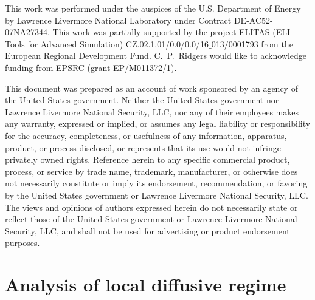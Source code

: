 \documentclass[
 aps,
 jmp,
 amsmath,amssymb,
 twocolumn,
]{revtex4-1}
\begin{document}
\begin{acknowledgments}
This work was performed under the auspices of the U.S. Department of Energy by Lawrence Livermore National Laboratory under Contract DE-AC52-07NA27344.
This work was partially supported by the project ELITAS (ELI Tools for Advanced Simulation) CZ.02.1.01/0.0/0.0/16$\_$013/0001793 from the European Regional Development Fund.
C.~P.~Ridgers would like to acknowledge funding from EPSRC (grant EP/M011372/1). 

This document was prepared as an account of work sponsored by an agency of the United States government. Neither the United States government nor Lawrence Livermore National Security, LLC, nor any of their employees makes any warranty, expressed or implied, or assumes any legal liability or responsibility for the accuracy, completeness, or usefulness of any information, apparatus, product, or process disclosed, or represents that its use would not infringe privately owned rights. Reference herein to any specific commercial product, process, or service by trade name, trademark, manufacturer, or otherwise does not necessarily constitute or imply its endorsement, recommendation, or favoring by the United States government or Lawrence Livermore National Security, LLC. The views and opinions of authors expressed herein do not necessarily state or reflect those of the United States government or Lawrence Livermore National Security, LLC, and shall not be used for advertising or product endorsement purposes.
\end{acknowledgments}

\appendix
\section{Analysis of local diffusive regime}
\label{app:DiffusiveKinetics}
\end{document}

